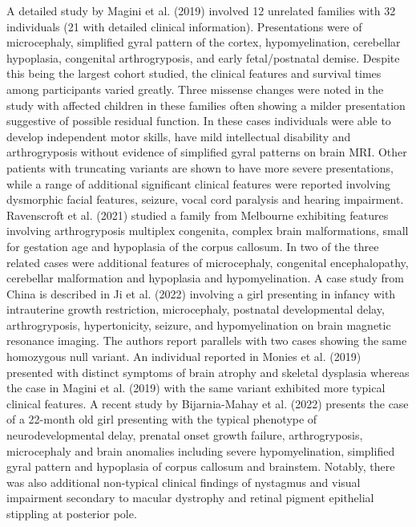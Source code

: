 \documentclass[
  letterpaper,
  DIV=11,
  numbers=noendperiod]{scrartcl}
\begin{document}
A detailed study by Magini et al. (2019) involved 12 unrelated families
with 32 individuals (21 with detailed clinical information).
Presentations were of microcephaly, simplified gyral pattern of the
cortex, hypomyelination, cerebellar hypoplasia, congenital
arthrogryposis, and early fetal/postnatal demise. Despite this being the
largest cohort studied, the clinical features and survival times among
participants varied greatly. Three missense changes were noted in the
study with affected children in these families often showing a milder
presentation suggestive of possible residual function. In these cases
individuals were able to develop independent motor skills, have mild
intellectual disability and arthrogryposis without evidence of
simplified gyral patterns on brain MRI. Other patients with truncating
variants are shown to have more severe presentations, while a range of
additional significant clinical features were reported involving
dysmorphic facial features, seizure, vocal cord paralysis and hearing
impairment. Ravenscroft et al. (2021) studied a family from Melbourne
exhibiting features involving arthrogryposis multiplex congenita,
complex brain malformations, small for gestation age and hypoplasia of
the corpus callosum. In two of the three related cases were additional
features of microcephaly, congenital encephalopathy, cerebellar
malformation and hypoplasia and hypomyelination. A case study from China
is described in Ji et al. (2022) involving a girl presenting in infancy
with intrauterine growth restriction, microcephaly, postnatal
developmental delay, arthrogryposis, hypertonicity, seizure, and
hypomyelination on brain magnetic resonance imaging. The authors report
parallels with two cases showing the same homozygous null variant. An
individual reported in Monies et al. (2019) presented with distinct
symptoms of brain atrophy and skeletal dysplasia whereas the case in
Magini et al. (2019) with the same variant exhibited more typical
clinical features. A recent study by Bijarnia-Mahay et al. (2022)
presents the case of a 22-month old girl presenting with the typical
phenotype of neurodevelopmental delay, prenatal onset growth failure,
arthrogryposis, microcephaly and brain anomalies including severe
hypomyelination, simplified gyral pattern and hypoplasia of corpus
callosum and brainstem. Notably, there was also additional non-typical
clinical findings of nystagmus and visual impairment secondary to
macular dystrophy and retinal pigment epithelial stippling at posterior
pole.
\end{document}
